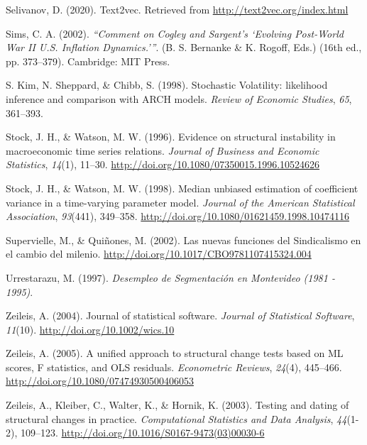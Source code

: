 \documentclass[12pt,oneside]{reedthesis}
\begin{document}
\leavevmode\hypertarget{ref-text2vec}{}%
Selivanov, D. (2020). Text2vec. Retrieved from \url{http://text2vec.org/index.html}

\leavevmode\hypertarget{ref-Sims2002}{}%
Sims, C. A. (2002). \emph{``Comment on Cogley and Sargent's `Evolving Post-World War II U.S. Inflation Dynamics.'''}. (B. S. Bernanke \& K. Rogoff, Eds.) (16th ed., pp. 373--379). Cambridge: MIT Press.

\leavevmode\hypertarget{ref-Kim1998}{}%
S. Kim, N. Sheppard, \& Chibb, S. (1998). Stochastic Volatility: likelihood inference and comparison with ARCH models. \emph{Review of Economic Studies}, \emph{65}, 361--393.

\leavevmode\hypertarget{ref-Stock1996}{}%
Stock, J. H., \& Watson, M. W. (1996). Evidence on structural instability in macroeconomic time series relations. \emph{Journal of Business and Economic Statistics}, \emph{14}(1), 11--30. \url{http://doi.org/10.1080/07350015.1996.10524626}

\leavevmode\hypertarget{ref-Stock1998}{}%
Stock, J. H., \& Watson, M. W. (1998). Median unbiased estimation of coefficient variance in a time-varying parameter model. \emph{Journal of the American Statistical Association}, \emph{93}(441), 349--358. \url{http://doi.org/10.1080/01621459.1998.10474116}

\leavevmode\hypertarget{ref-Quinones2001}{}%
Supervielle, M., \& Quiñones, M. (2002). Las nuevas funciones del Sindicalismo en el cambio del milenio. \url{http://doi.org/10.1017/CBO9781107415324.004}

\leavevmode\hypertarget{ref-Urrestarazu1997}{}%
Urrestarazu, M. (1997). \emph{Desempleo de Segmentación en Montevideo (1981 - 1995)}.

\leavevmode\hypertarget{ref-Zeileis2004}{}%
Zeileis, A. (2004). Journal of statistical software. \emph{Journal of Statistical Software}, \emph{11}(10). \url{http://doi.org/10.1002/wics.10}

\leavevmode\hypertarget{ref-Zeileis2005}{}%
Zeileis, A. (2005). A unified approach to structural change tests based on ML scores, F statistics, and OLS residuals. \emph{Econometric Reviews}, \emph{24}(4), 445--466. \url{http://doi.org/10.1080/07474930500406053}

\leavevmode\hypertarget{ref-Zeileis2003}{}%
Zeileis, A., Kleiber, C., Walter, K., \& Hornik, K. (2003). Testing and dating of structural changes in practice. \emph{Computational Statistics and Data Analysis}, \emph{44}(1-2), 109--123. \url{http://doi.org/10.1016/S0167-9473(03)00030-6}
\end{document}
